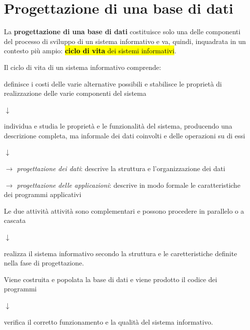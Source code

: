 \documentclass[12pt, a4paper, oneside]{book}
\begin{document}
    \chapter{Progettazione di una base di dati}
    La \textbf{progettazione di una base di dati} costituisce solo una delle componenti del processo di sviluppo di un sistema informativo e va, quindi, inquadrata in un contesto più ampio: \hl{\textbf{ciclo di vita} dei sistemi informativi}.

    Il ciclo di vita di un sistema informativo comprende:
    \begin{description}
      \centering
      \item [\textcolor{azzurrino}{studio della fattibilità}] 
      \item definisce i costi delle varie alternative possibili e stabilisce le proprietà di realizzazione delle varie componenti del sistema
      \smallskip
      \item $\downarrow$
      \smallskip
      \item [\textcolor{azzurrino}{raccolta  e analisi dei requisiti}]
      \item individua e studia le proprietà e le funzionalità del sistema, producendo una descrizione completa, ma informale dei dati coinvolti e delle operazioni su di essi
      \smallskip
      \item $\downarrow$
      \smallskip
      \item [\textcolor{azzurrino}{progettazione}]
      \item $\rightarrow$ \textit{progettazione dei dati}: descrive la struttura e l'organizzazione dei dati
      
      $\rightarrow$ \textit{progettazione delle applicazioni}: descrive in modo formale le caratteristiche dei programmi applicativi
      
      Le due attività attività sono complementari e possono procedere in parallelo o a cascata
      \smallskip
      \item $\downarrow$
      \smallskip
      \item [\textcolor{azzurrino}{implementazione}]
      \item realizza il sistema informativo secondo la struttura e le caretteristiche definite nella fase di progettazione.
      
      Viene costruita e popolata la base di dati e viene prodotto il codice dei programmi
      \smallskip
      \item $\downarrow$
      \smallskip
      \item [\textcolor{azzurrino}{validazione e collaudo}]
      \item verifica il corretto funzionamento e la qualità del sistema informativo.
      

\end{description}
\end{document}
